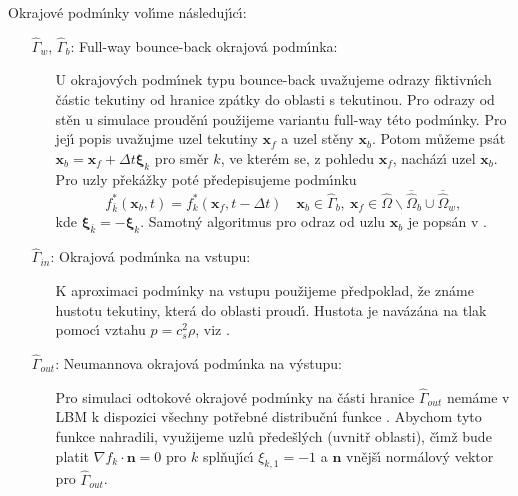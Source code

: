             Okrajov\'{e} podm\'{\i}nky vol\'{\i}me n\'{a}sleduj\'{\i}c\'{\i}:
            
            \begin{itemize}
                \item[$\hat{\Gamma}_w$, $\hat{\Gamma}_b$:]  Full-way bounce-back okrajov\'{a} podm\'{\i}nka: \begin{itemize} 
                    \item[] U okrajov\'{y}ch podm\'{\i}nek typu bounce-back uva\v{z}ujeme odrazy fiktivn\'{\i}ch \v{c}\'{a}stic tekutiny od hranice zp\'{a}tky do oblasti s tekutinou. Pro odrazy od st\v{e}n u simulace proud\v{e}n\'{\i} pou\v{z}ijeme variantu full-way t\'{e}to podm\'{\i}nky. Pro jej\'{\i} popis uva\v{z}ujme uzel tekutiny $\boldsymbol{x}_f$ a uzel st\v{e}ny $\boldsymbol{x}_b$. Potom m\r{u}\v{z}eme ps\'{a}t $\boldsymbol{x}_b = \boldsymbol{x}_f + \Delta t \boldsymbol{\xi}_k$ pro sm\v{e}r $k$, ve kter\'{e}m se, z pohledu $\boldsymbol{x}_f$, nach\'{a}z\'{\i} uzel $\boldsymbol{x}_b$. Pro uzly p\v{r}ek\'{a}\v{z}ky pot\'{e} p\v{r}edepisujeme podm\'{\i}nku \begin{equation}
                        \label{eq:FulBouBac}
                            f_{\bar{k}}^*(\boldsymbol{x}_b, t) = f_{k}^{*}(\boldsymbol{x}_f, t - \Delta t) \quad \boldsymbol{x}_b \in \hat{\Gamma}_b, \ \boldsymbol{x}_f \in \hat{\Omega} \backslash \overline{\hat{\Omega}}_b \cup \overline{\hat{\Omega}}_w,
                        \end{equation} kde $\boldsymbol{\xi}_{\bar{k}} = - \boldsymbol{\xi}_k$. Samotn\'{y} algoritmus pro odraz od uzlu $\boldsymbol{x}_b$ je pops\'{a}n v \cite{BP_DH}.
                    \end{itemize}
                \item[$\hat{\Gamma}_{in}$:] Okrajov\'{a} podm\'{\i}nka na vstupu: \begin{itemize}
                        \item [] K aproximaci podm\'{\i}nky na vstupu pou\v{z}ijeme p\v{r}edpoklad, \v{z}e zn\'{a}me hustotu tekutiny, kter\'{a} do oblasti proud\'{\i}. Hustota je nav\'{a}z\'{a}na na tlak pomoc\'{\i} vztahu $p = c_s^2\rho$, viz \cite{kruger2017lattice}.
                \end{itemize}
                \item[$\hat{\Gamma}_{out}$:] Neumannova okrajov\'{a} podm\'{\i}nka na v\'{y}stupu: \begin{itemize} \item[] Pro simulaci odtokov\'{e} okrajov\'{e} podm\'{\i}nky na \v{c}\'{a}sti hranice $\hat{\Gamma}_{out}$ nem\'{a}me v LBM k dispozici v\v{s}echny pot\v{r}ebn\'{e} distribu\v{c}n\'{\i} funkce \cite{kruger2017lattice, BP_DH}. Abychom tyto funkce nahradili, vyu\v{z}ijeme uzl\r{u} p\v{r}ede\v{s}l\'{y}ch (uvnit\v{r} oblasti), \v{c}\'{\i}m\v{z} bude platit $\nabla f_k \cdot \boldsymbol{n} = 0$ pro $k$ spl\v{n}uj\'{\i}c\'{\i} $\xi_{k,1} = -1$ a $\boldsymbol{n}$ vn\v{e}j\v{s}\'{\i} norm\'{a}lov\'{y} vektor pro $\hat{\Gamma}_{out}$.\end{itemize}
            \end{itemize}


